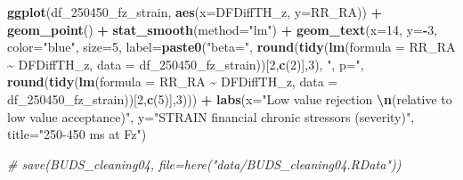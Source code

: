 \documentclass[
]{article}
\newenvironment{Shaded}{\begin{snugshade}}{\end{snugshade}}
\newcommand{\AttributeTok}[1]{\textcolor[rgb]{0.13,0.29,0.53}{#1}}
\newcommand{\CommentTok}[1]{\textcolor[rgb]{0.56,0.35,0.01}{\textit{#1}}}
\newcommand{\DecValTok}[1]{\textcolor[rgb]{0.00,0.00,0.81}{#1}}
\newcommand{\FunctionTok}[1]{\textcolor[rgb]{0.13,0.29,0.53}{\textbf{#1}}}
\newcommand{\NormalTok}[1]{#1}
\newcommand{\SpecialCharTok}[1]{\textcolor[rgb]{0.81,0.36,0.00}{\textbf{#1}}}
\newcommand{\StringTok}[1]{\textcolor[rgb]{0.31,0.60,0.02}{#1}}
\begin{document}
\begin{Shaded}
\begin{Highlighting}[]
\FunctionTok{ggplot}\NormalTok{(df\_250450\_fz\_strain, }\FunctionTok{aes}\NormalTok{(}\AttributeTok{x=}\NormalTok{DFDiffTH\_z, }\AttributeTok{y=}\NormalTok{RR\_RA)) }\SpecialCharTok{+}
  \FunctionTok{geom\_point}\NormalTok{() }\SpecialCharTok{+}
  \FunctionTok{stat\_smooth}\NormalTok{(}\AttributeTok{method=}\StringTok{"lm"}\NormalTok{) }\SpecialCharTok{+}
  \FunctionTok{geom\_text}\NormalTok{(}\AttributeTok{x=}\DecValTok{14}\NormalTok{, }\AttributeTok{y=}\SpecialCharTok{{-}}\DecValTok{3}\NormalTok{, }\AttributeTok{color=}\StringTok{"blue"}\NormalTok{, }\AttributeTok{size=}\DecValTok{5}\NormalTok{, }\AttributeTok{label=}\FunctionTok{paste0}\NormalTok{(}\StringTok{"beta="}\NormalTok{,}
       \FunctionTok{round}\NormalTok{(}\FunctionTok{tidy}\NormalTok{(}\FunctionTok{lm}\NormalTok{(}\AttributeTok{formula =}\NormalTok{ RR\_RA }\SpecialCharTok{\textasciitilde{}}\NormalTok{ DFDiffTH\_z, }\AttributeTok{data =}\NormalTok{ df\_250450\_fz\_strain))[}\DecValTok{2}\NormalTok{,}\FunctionTok{c}\NormalTok{(}\DecValTok{2}\NormalTok{)],}\DecValTok{3}\NormalTok{),}
       \StringTok{", p="}\NormalTok{, }
       \FunctionTok{round}\NormalTok{(}\FunctionTok{tidy}\NormalTok{(}\FunctionTok{lm}\NormalTok{(}\AttributeTok{formula =}\NormalTok{ RR\_RA }\SpecialCharTok{\textasciitilde{}}\NormalTok{ DFDiffTH\_z, }\AttributeTok{data =}\NormalTok{ df\_250450\_fz\_strain))[}\DecValTok{2}\NormalTok{,}\FunctionTok{c}\NormalTok{(}\DecValTok{5}\NormalTok{)],}\DecValTok{3}\NormalTok{))) }\SpecialCharTok{+}
    \FunctionTok{labs}\NormalTok{(}\AttributeTok{x=}\StringTok{"Low value rejection }\SpecialCharTok{\textbackslash{}n}\StringTok{(relative to low value acceptance)"}\NormalTok{,}
       \AttributeTok{y=}\StringTok{"STRAIN financial chronic stressors (severity)"}\NormalTok{,}
       \AttributeTok{title=}\StringTok{"250{-}450 ms at Fz"}\NormalTok{)}
\end{Highlighting}
\end{Shaded}

\begin{Shaded}
\begin{Highlighting}[]
\CommentTok{\# save(BUDS\_cleaning04, file=here("data/BUDS\_cleaning04.RData"))}
\end{Highlighting}
\end{Shaded}
\end{document}
